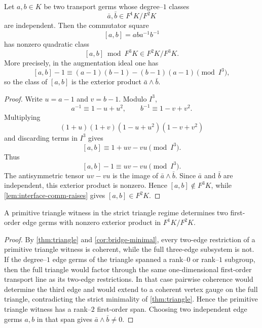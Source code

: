 \begin{lemma}
\label{lem:primitive-two-cell-magnus}
Let \(a,b\in K\) be two transport germs whose degree--\(1\) classes
\[
\bar a,\bar b\in F^1K/F^2K
\]
are independent.  Then the commutator square
\[
[a,b]=aba^{-1}b^{-1}
\]
has nonzero quadratic class
\[
[a,b]\bmod F^3K\in F^2K/F^3K.
\]
More precisely, in the augmentation ideal one has
\[
[a,b]-1\equiv (a-1)(b-1)-(b-1)(a-1) \pmod {I^3},
\]
so the class of \([a,b]\) is the exterior product
\(\bar a\wedge\bar b\).
\end{lemma}
\begin{proof}
Write \(u=a-1\) and \(v=b-1\).  Modulo \(I^3\),
\[
	a^{-1}\equiv 1-u+u^2,
	\qquad
	b^{-1}\equiv 1-v+v^2.
\]
Multiplying
\[
	(1+u)(1+v)(1-u+u^2)(1-v+v^2)
\]
and discarding terms in \(I^3\) gives
\[
	[a,b]\equiv 1+uv-vu \pmod {I^3}.
\]
Thus
\[
	[a,b]-1\equiv uv-vu \pmod {I^3}.
\]
The antisymmetric tensor \(uv-vu\) is the image of
\(\bar a\wedge\bar b\).  Since \(\bar a\) and \(\bar b\) are independent,
this exterior product is nonzero.  Hence \([a,b]\notin F^3K\), while
\cref{lem:interface-comm-raises} gives \([a,b]\in F^2K\).
\end{proof}
\begin{lemma}
\label{lem:minimal-triangle-area}
A primitive triangle witness in the strict triangle regime determines two
first-order edge germs with nonzero exterior product in \(F^1K/F^2K\).
\end{lemma}
\begin{proof}
By \cref{thm:triangle} and \cref{cor:bridge-minimal}, every two-edge
restriction of a primitive triangle witness is coherent, while the full
three-edge subsystem is not.  If the degree--\(1\) edge germs of the
triangle spanned a rank--\(0\) or rank--\(1\) subgroup, then the full
triangle would factor through the same one-dimensional first-order
transport line as its two-edge restrictions.  In that case pairwise
coherence would determine the third edge and would extend to a coherent
vertex gauge on the full triangle, contradicting the strict minimality of
\cref{thm:triangle}.  Hence the primitive triangle witness has a rank--\(2\)
first-order span.  Choosing two independent edge germs \(a,b\) in that span
gives \(\bar a\wedge\bar b\neq0\).
\end{proof}
